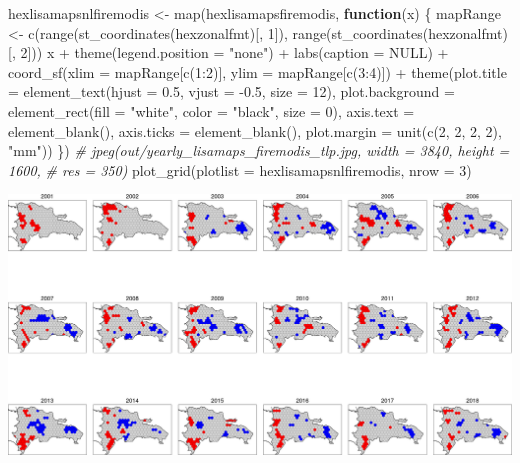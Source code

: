 \documentclass[10pt,landscape,a3paper]{article}
\newenvironment{Shaded}{\begin{snugshade}}{\end{snugshade}}
\newcommand{\AttributeTok}[1]{\textcolor[rgb]{0.77,0.63,0.00}{#1}}
\newcommand{\CommentTok}[1]{\textcolor[rgb]{0.56,0.35,0.01}{\textit{#1}}}
\newcommand{\ConstantTok}[1]{\textcolor[rgb]{0.00,0.00,0.00}{#1}}
\newcommand{\ControlFlowTok}[1]{\textcolor[rgb]{0.13,0.29,0.53}{\textbf{#1}}}
\newcommand{\DecValTok}[1]{\textcolor[rgb]{0.00,0.00,0.81}{#1}}
\newcommand{\FloatTok}[1]{\textcolor[rgb]{0.00,0.00,0.81}{#1}}
\newcommand{\FunctionTok}[1]{\textcolor[rgb]{0.00,0.00,0.00}{#1}}
\newcommand{\NormalTok}[1]{#1}
\newcommand{\OtherTok}[1]{\textcolor[rgb]{0.56,0.35,0.01}{#1}}
\newcommand{\SpecialCharTok}[1]{\textcolor[rgb]{0.00,0.00,0.00}{#1}}
\newcommand{\StringTok}[1]{\textcolor[rgb]{0.31,0.60,0.02}{#1}}
\begin{document}
\begin{Shaded}
\begin{Highlighting}[]
\NormalTok{hexlisamapsnlfiremodis }\OtherTok{\textless{}{-}} \FunctionTok{map}\NormalTok{(hexlisamapsfiremodis, }\ControlFlowTok{function}\NormalTok{(x) \{}
\NormalTok{    mapRange }\OtherTok{\textless{}{-}} \FunctionTok{c}\NormalTok{(}\FunctionTok{range}\NormalTok{(}\FunctionTok{st\_coordinates}\NormalTok{(hexzonalfmt)[, }\DecValTok{1}\NormalTok{]), }\FunctionTok{range}\NormalTok{(}\FunctionTok{st\_coordinates}\NormalTok{(hexzonalfmt)[,}
        \DecValTok{2}\NormalTok{]))}
\NormalTok{    x }\SpecialCharTok{+} \FunctionTok{theme}\NormalTok{(}\AttributeTok{legend.position =} \StringTok{"none"}\NormalTok{) }\SpecialCharTok{+} \FunctionTok{labs}\NormalTok{(}\AttributeTok{caption =} \ConstantTok{NULL}\NormalTok{) }\SpecialCharTok{+} \FunctionTok{coord\_sf}\NormalTok{(}\AttributeTok{xlim =}\NormalTok{ mapRange[}\FunctionTok{c}\NormalTok{(}\DecValTok{1}\SpecialCharTok{:}\DecValTok{2}\NormalTok{)],}
        \AttributeTok{ylim =}\NormalTok{ mapRange[}\FunctionTok{c}\NormalTok{(}\DecValTok{3}\SpecialCharTok{:}\DecValTok{4}\NormalTok{)]) }\SpecialCharTok{+} \FunctionTok{theme}\NormalTok{(}\AttributeTok{plot.title =} \FunctionTok{element\_text}\NormalTok{(}\AttributeTok{hjust =} \FloatTok{0.5}\NormalTok{, }\AttributeTok{vjust =} \SpecialCharTok{{-}}\FloatTok{0.5}\NormalTok{,}
        \AttributeTok{size =} \DecValTok{12}\NormalTok{), }\AttributeTok{plot.background =} \FunctionTok{element\_rect}\NormalTok{(}\AttributeTok{fill =} \StringTok{"white"}\NormalTok{, }\AttributeTok{color =} \StringTok{"black"}\NormalTok{,}
        \AttributeTok{size =} \DecValTok{0}\NormalTok{), }\AttributeTok{axis.text =} \FunctionTok{element\_blank}\NormalTok{(), }\AttributeTok{axis.ticks =} \FunctionTok{element\_blank}\NormalTok{(), }\AttributeTok{plot.margin =} \FunctionTok{unit}\NormalTok{(}\FunctionTok{c}\NormalTok{(}\DecValTok{2}\NormalTok{,}
        \DecValTok{2}\NormalTok{, }\DecValTok{2}\NormalTok{, }\DecValTok{2}\NormalTok{), }\StringTok{"mm"}\NormalTok{))}
\NormalTok{\})}
\CommentTok{\# jpeg(\textquotesingle{}out/yearly\_lisamaps\_firemodis\_tlp.jpg\textquotesingle{}, width = 3840, height = 1600,}
\CommentTok{\# res = 350)}
\FunctionTok{plot\_grid}\NormalTok{(}\AttributeTok{plotlist =}\NormalTok{ hexlisamapsnlfiremodis, }\AttributeTok{nrow =} \DecValTok{3}\NormalTok{)}
\end{Highlighting}
\end{Shaded}

\begin{center}\includegraphics{img/modelling/aa-lisa-maps-3} \end{center}
\end{document}

